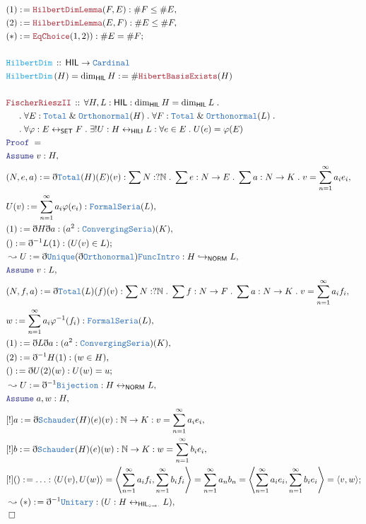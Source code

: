 \documentclass[12pt]{scrartcl}
\newcommand{\TYPE}[1]{\textcolor{NavyBlue}{\mathtt{#1}}}
\newcommand{\FUNC}[1]{\textcolor{Cerulean}{\mathtt{#1}}}
\newcommand{\LOGIC}[1]{\textcolor{Blue}{\mathtt{#1}}}
\newcommand{\THM}[1]{\textcolor{Maroon}{\mathtt{#1}}}
\renewcommand{\.}{\; . \;}
\newcommand{\de}{: \kern 0.1pc =}
\newcommand{\Act}[1]{\left( #1 \right)}
\newcommand{\Theorem}[2]{& \THM{#1} \, :: \, #2 \\ & \Proof = \\ }
\newcommand{\DeclareFunc}[2]{& \FUNC{#1} \, :: \, #2 \\}
\newcommand{\DefineNamedFunc}[4]{&  \FUNC{#1}\Act{#2} = #3 \de #4 \\}
\newcommand{\NewLine}{\\ & \kern 1pc}
\newcommand{\Page}[1]{\begin{align*} #1 \end{align*} \newpage   }
\newcommand{ \bd }{ \ByDef }
\renewcommand{\And}{\; \& \;}
\newcommand{\Nat}{\mathbb{N} }
\newcommand{\ToInj}{\hookrightarrow}
\newcommand{\ToBij}{\leftrightarrow}
\newcommand{\Say}[3]{& #1 \de #2 : #3, \\}
\newcommand{\Conclude}[3]{& #1 \de #2 : #3; \\}
\newcommand{\Derive}[3]{& \leadsto #1 \de #2 : #3, \\}
\newcommand{\A}{\LOGIC{Assume} \;}
\newcommand{\Assume}[2]{& \A #1 : #2, \\}
\newcommand{\QED}{\; \square}
\newcommand{\EndProof}{& \QED \\}
\newcommand{\ByDef}{\eth}
\newcommand{\Proof}{\LOGIC{Proof} \; }
\newcommand{\NORM}{\textsf{NORM}}
\newcommand{\HIL}{\textsf{HIL}}
\newcommand{\HILI}{{\textsf{HIL}_{\circ \to \cdot}}}
\begin{document}
 \Page{
 \Say{(1)}{\THM{HilbertDimLemma}(F,E)}{\# F \le \# E}
 \Say{(2)}{\THM{HilbertDimLemma}(E,F)}{\# E \le \# F}
 \Conclude{(*)}{\THM{EqChoice}(1,2))}{\# E = \# F}
 \\ 
 \DeclareFunc{HilbertDim}{\HIL \to \TYPE{Cardinal} }
 \DefineNamedFunc{HilbertDim}{H}{\dim_\HIL H}{\# \THM{HibertBasisExists}(H)}
 \\
  \Theorem{FischerRieszII}{ \forall H, L : \HIL  : \dim_\HIL H = \dim_\HIL L \. 
  \NewLine
  \. \forall E : \TYPE{Total} \And 
 \TYPE{Orthonormal}(H) \. \forall  F : \TYPE{Total} \And 
 \TYPE{Orthonormal}(L) \. \NewLine \. 
  \forall \varphi : E \ToBij_\mathsf{SET} F \. \exists! U : H \ToBij_\mathsf{HILI} L :
  \forall e \in E \. U(e) = \varphi(E) }
  \Assume{v}{H}
 \Say{(N,e,a)}{ \bd \TYPE{Total}(H)(E)(v)}{  \sum N : ?\Nat \. \sum e : N \to E \. \sum a : N \to  K  \. v = \sum^\infty_{n = 1} a_i e_i }
 \Say{U(v)}{\sum^\infty_{n = 1} a_i \varphi(e_i)}{\TYPE{FormalSeria}(L)}
 \Say{(1)}{\bd H \bd a }{(a^2 : \TYPE{ConvergingSeria})(K)}
 \Conclude{()}{ \bd^{-1} L (1)  }{ (U(v) \in L)}
 \Derive{U}{\bd \TYPE{Unique}( \bd \TYPE{Orthonormal})\TYPE{FuncIntro}}{H \ToInj_\NORM L}
  \Assume{v}{L}
 \Say{(N,f,a)}{ \bd \TYPE{Total}(L)(f)(v)}{ \sum N : ?\Nat \. \sum f : N \to F \. \sum a : N \to  K  \. v = \sum^\infty_{n = 1} a_i f_i  }
 \Say{w}{\sum^\infty_{n = 1} a_i \varphi^{-1}(f_i)}{\TYPE{FormalSeria}(L)}
 \Say{(1)}{\bd L \bd a }{(a^2 : \TYPE{ConvergingSeria})(K)}
 \Say{(2)}{ \bd^{-1} H (1)  }{ (w \in H)}
 \Conclude{()}{\bd U (2) (w) }{U(w) = u}
 \Derive{U}{\bd^{-1} \TYPE{Bijection}}{H \ToBij_\NORM L}
 \Assume{a,w}{H}
 \Say{[!]a}{ \bd \TYPE{Schauder}(H)(e)(v)}{ \Nat \to K : v = \sum^\infty_{n = 1} a_i e_i }
 \Say{[!]b}{ \bd \TYPE{Schauder}(H)(e)(w)}{ \Nat \to K : w = \sum^\infty_{n = 1} b_i e_i }
 \Conclude{[!]()}{\ldots}{\langle U(v) , U(w) \rangle = \left\langle \sum^\infty_{n=1} a_i f_i, \sum^\infty_{n=1} b_i f_i \right\rangle = \sum^\infty_{n = 1} a_n b_n   = 
 \left\langle \sum^\infty_{n=1} a_i e_i, \sum^\infty_{n=1} b_i e_i \right\rangle
 = \langle v, w \rangle
 }
 \Derive{(*)}{ \bd^{-1} \TYPE{Unitary}}{ ( U : H \ToBij_{\HILI} L)}
 \EndProof
}
\end{document}
